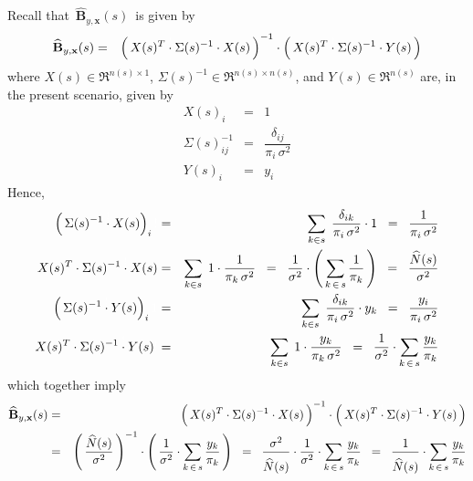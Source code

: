 \proof
Recall that \,$\widehat{\mathbf{B}}_{y,\mathbf{x}}(s)$\, is given by
\begin{eqnarray*}
\widehat{\mathbf{B}}_{y,\mathbf{x}}(s)
& = &
	\left(\,X(s)^{T} \overset{{\color{white}!}}{\cdot} \Sigma(s)^{-1} \cdot X(s)\,\right)^{-1}
	\cdot
	\left(\,X(s)^{T} \overset{{\color{white}!}}{\cdot} \Sigma(s)^{-1} \cdot Y(s) \,\right)
\end{eqnarray*}
where $X(s) \in \Re^{n(s) \times 1}$, $\Sigma(s)^{-1} \in \Re^{n(s) \times n(s)}$, and $Y(s) \in \Re^{n(s)}$
are, in the present scenario, given by
\begin{eqnarray*}
X(s)_{i}
& = &
	1
\\
\Sigma(s)^{-1}_{ij}
& = &
	\dfrac{\delta_{ij}}{\pi_{i}\,\sigma^{2}}
\\
Y(s)_{i}
& = &
	y_{i}
\end{eqnarray*}
Hence,
\begin{eqnarray*}
\left(\,\Sigma(s)^{-1} \overset{{\color{white}!}}{\cdot} X(s)\right)_{i}{\color{white}!}
& = &
	\underset{k \in s}{\sum}\;\,
	\dfrac{\delta_{ik}}{\pi_{i}\,\sigma^{2}} \cdot 1
\;\; = \;\;
	\dfrac{1}{\pi_{i}\,\sigma^{2}}
\\
X(s)^{T}\cdot\Sigma(s)^{-1} \overset{{\color{white}!}}{\cdot} X(s)
& = &
	\underset{k \in s}{\sum}\;\,
	1 \cdot \dfrac{1}{\pi_{k}\,\sigma^{2}}
\;\; = \;\;
	\dfrac{1}{\sigma^{2}}
	\cdot
	\left(\,\underset{k\,\in\,s}{\sum}\,\dfrac{1}{\pi_{k}}\,\right)
\;\; = \;\;
	\dfrac{\widehat{N}(s)}{\sigma^{2}}
\\
\left(\,\Sigma(s)^{-1} \overset{{\color{white}!}}{\cdot} Y(s)\right)_{i}{\color{white}1}
& = &
	\underset{k \in s}{\sum}\;\,
	\dfrac{\delta_{ik}}{\pi_{i}\,\sigma^{2}}
	\cdot
	y_{k}
\;\; = \;\;
	\dfrac{y_{i}}{\pi_{i}\,\sigma^{2}}
\\
X(s)^{T}\cdot\Sigma(s)^{-1} \overset{{\color{white}!}}{\cdot} Y(s){\color{white}!}
& = &
	\underset{k \in s}{\sum}\;\,
	1 \cdot \dfrac{y_{k}}{\pi_{k}\,\sigma^{2}}
\;\; = \;\;
	\dfrac{1}{\sigma^{2}}
	\cdot
	\underset{k\,\in\,s}{\sum}\, \dfrac{y_{k}}{\pi_{k}}
\end{eqnarray*}
which together imply
\begin{eqnarray*}
\widehat{\mathbf{B}}_{y,\mathbf{x}}(s)
& = &
	\left(\,X(s)^{T} \overset{{\color{white}!}}{\cdot} \Sigma(s)^{-1} \cdot X(s)\,\right)^{-1}
	\cdot
	\left(\,X(s)^{T} \overset{{\color{white}!}}{\cdot} \Sigma(s)^{-1} \cdot Y(s) \,\right)
\\
& = &
	\left(\, \dfrac{\widehat{N}(s)}{\sigma^{2}} \,\right)^{-1}
	\cdot
	\left(\,
		\dfrac{1}{\sigma^{2}}
		\cdot
		\underset{k\,\in\,s}{\sum}\, \dfrac{y_{k}}{\pi_{k}}
	\,\right)
\;\; = \;\;
	\dfrac{\sigma^{2}}{\overset{{\color{white}.}}{\widehat{N}(s)}}
	\cdot
	\dfrac{1}{\sigma^{2}}
	\cdot
	\underset{k\,\in\,s}{\sum}\, \dfrac{y_{k}}{\pi_{k}}
\;\; = \;\;
	\dfrac{1}{\overset{{\color{white}.}}{\widehat{N}(s)}}
	\cdot
	\underset{k\,\in\,s}{\sum}\, \dfrac{y_{k}}{\pi_{k}}
\end{eqnarray*}
